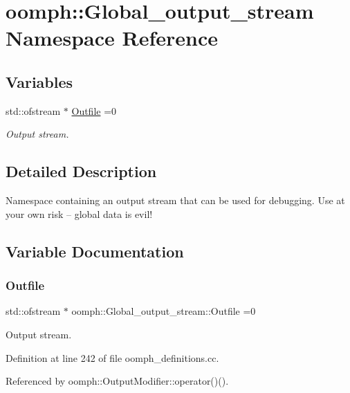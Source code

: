 \hypertarget{namespaceoomph_1_1Global__output__stream}{}\section{oomph\+:\+:Global\+\_\+output\+\_\+stream Namespace Reference}
\label{namespaceoomph_1_1Global__output__stream}
\subsection*{Variables}
\begin{DoxyCompactItemize}
\item 
std\+::ofstream $\ast$ \hyperlink{namespaceoomph_1_1Global__output__stream_a901672f81bb0b5d8bab3196da94e8867}{Outfile} =0
\begin{DoxyCompactList}\small\item\em Output stream. \end{DoxyCompactList}\end{DoxyCompactItemize}


\subsection{Detailed Description}
Namespace containing an output stream that can be used for debugging. Use at your own risk -- global data is evil! 

\subsection{Variable Documentation}
\mbox{\label{namespaceoomph_1_1Global__output__stream_a901672f81bb0b5d8bab3196da94e8867}} 
\subsubsection{\texorpdfstring{Outfile}{Outfile}}
{\footnotesize\ttfamily std\+::ofstream $\ast$ oomph\+::\+Global\+\_\+output\+\_\+stream\+::\+Outfile =0}



Output stream. 



Definition at line 242 of file oomph\+\_\+definitions.\+cc.



Referenced by oomph\+::\+Output\+Modifier\+::operator()().

